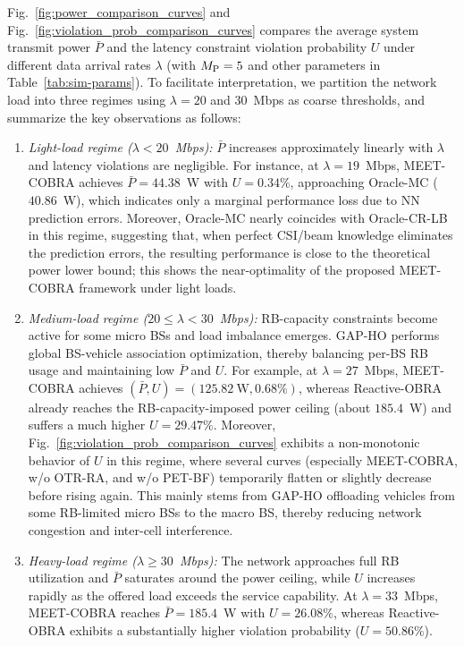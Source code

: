 \documentclass[conference, a4paper]{IEEEtran}
\theoremstyle{remark}
\begin{document}
Fig.~\ref{fig:power_comparison_curves} and Fig.~\ref{fig:violation_prob_comparison_curves} compares the average system transmit power $\bar{P}$ and the latency constraint violation probability $U$ under different data arrival rates $\lambda$ (with $M_{\rm P}=5$ and other parameters in Table~\ref{tab:sim-params}).
To facilitate interpretation, we partition the network load into three regimes using $\lambda=20$ and $30$~Mbps as coarse thresholds, and summarize the key observations as follows:
\begin{enumerate}
    \item \emph{Light-load regime ($\lambda<20$~Mbps):} 
    $\bar{P}$ increases approximately linearly with $\lambda$ and latency violations are negligible. 
    For instance, at $\lambda=19$~Mbps, MEET-COBRA achieves $\bar{P}=44.38$~W with $U=0.34\%$, approaching Oracle-MC ($40.86$~W), which indicates only a marginal performance loss due to NN prediction errors. 
    Moreover, Oracle-MC nearly coincides with Oracle-CR-LB in this regime, suggesting that, when perfect CSI/beam knowledge eliminates the prediction errors, the resulting performance is close to the theoretical power lower bound; this shows the near-optimality of the proposed MEET-COBRA framework under light loads.    

    \item \emph{Medium-load regime ($20\le\lambda<30$~Mbps):} 
    RB-capacity constraints become active for some micro BSs and load imbalance emerges. GAP-HO performs global BS-vehicle association optimization, thereby balancing per-BS RB usage and maintaining low $\bar{P}$ and $U$. For example, at $\lambda=27$~Mbps, MEET-COBRA achieves $(\bar{P},U)=(125.82~\text{W},0.68\%)$, whereas Reactive-OBRA already reaches the RB-capacity-imposed power ceiling (about $185.4$~W) and suffers a much higher $U=29.47\%$.
    Moreover, Fig.~\ref{fig:violation_prob_comparison_curves} exhibits a non-monotonic behavior of $U$ in this regime, where several curves (especially MEET-COBRA, w/o OTR-RA, and w/o PET-BF) temporarily flatten or slightly decrease before rising again. This mainly stems from GAP-HO offloading vehicles from some RB-limited micro BSs to the macro BS, thereby reducing network congestion and inter-cell interference.

    \item \emph{Heavy-load regime ($\lambda\ge 30$~Mbps):} 
    The network approaches full RB utilization and $\bar{P}$ saturates around the power ceiling, while $U$ increases rapidly as the offered load exceeds the service capability.  At $\lambda=33$~Mbps, MEET-COBRA reaches $\bar{P}=185.4$~W with $U=26.08\%$, whereas Reactive-OBRA exhibits a substantially higher violation probability ($U=50.86\%$).
\end{enumerate}
\end{document}
